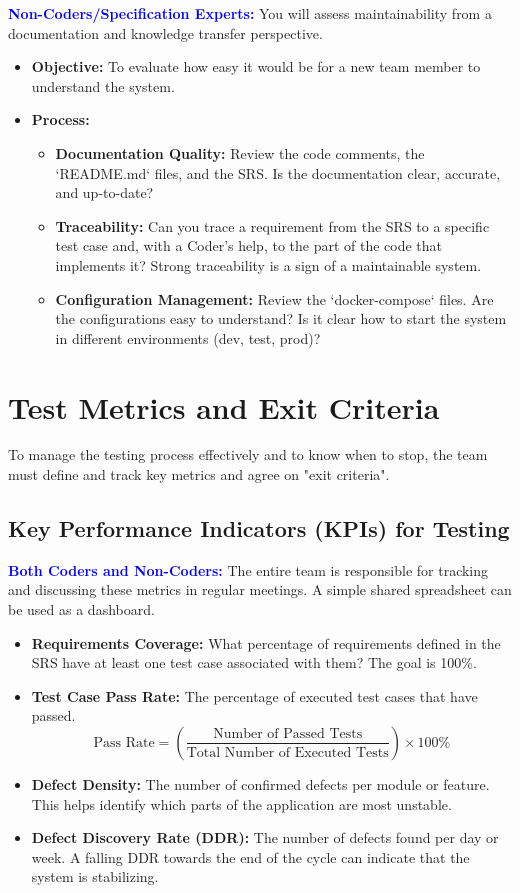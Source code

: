\documentclass{article}
\newcommand{\role}[1]{\textbf{\textcolor{blue}{#1:}}}
\begin{document}
\role{Non-Coders/Specification Experts}
You will assess maintainability from a documentation and knowledge transfer perspective.
\begin{itemize}
    \item \textbf{Objective:} To evaluate how easy it would be for a new team member to understand the system.
    \item \textbf{Process:}
    \begin{itemize}
        \item \textbf{Documentation Quality:} Review the code comments, the `README.md` files, and the SRS. Is the documentation clear, accurate, and up-to-date?
        \item \textbf{Traceability:} Can you trace a requirement from the SRS to a specific test case and, with a Coder's help, to the part of the code that implements it? Strong traceability is a sign of a maintainable system.
        \item \textbf{Configuration Management:} Review the `docker-compose` files. Are the configurations easy to understand? Is it clear how to start the system in different environments (dev, test, prod)?
    \end{itemize}
\end{itemize}

\section{Test Metrics and Exit Criteria}
To manage the testing process effectively and to know when to stop, the team must define and track key metrics and agree on "exit criteria".

\subsection{Key Performance Indicators (KPIs) for Testing}
\role{Both Coders and Non-Coders}
The entire team is responsible for tracking and discussing these metrics in regular meetings. A simple shared spreadsheet can be used as a dashboard.

\begin{itemize}
    \item \textbf{Requirements Coverage:} What percentage of requirements defined in the SRS have at least one test case associated with them? The goal is 100\%.
    \item \textbf{Test Case Pass Rate:} The percentage of executed test cases that have passed.
    $$ \text{Pass Rate} = \left( \frac{\text{Number of Passed Tests}}{\text{Total Number of Executed Tests}} \right) \times 100\% $$
    \item \textbf{Defect Density:} The number of confirmed defects per module or feature. This helps identify which parts of the application are most unstable.
    \item \textbf{Defect Discovery Rate (DDR):} The number of defects found per day or week. A falling DDR towards the end of the cycle can indicate that the system is stabilizing.
\end{itemize}
\end{document}
